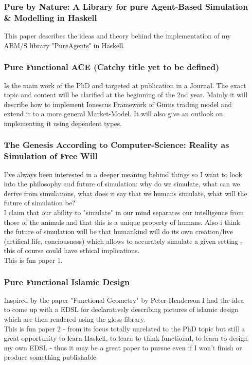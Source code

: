 \subsubsection{Pure by Nature: A Library for pure Agent-Based Simulation \& Modelling in Haskell}
This paper describes the ideas and theory behind the implementation of my ABM/S library "PureAgents" in Haskell.

\subsubsection{Pure Functional ACE (Catchy title yet to be defined)}
Is the main work of the PhD and targeted at publication in a Journal. The exact topic and content will be clarified at the beginning of the 2nd year. Mainly it will describe how to implement Ionescus Framework of Gintis trading model and extend it to a more general Market-Model. It will also give an outlook on implementing it using dependent types.

\subsubsection{The Genesis According to Computer-Science: Reality as Simulation of Free Will}
I've always been interested in a deeper meaning behind things so I want to look into the philosophy and future of simulation: why do we simulate, what can we derive from simulations, what does it say that we humans simulate, what will the future of simulation be? \\
I claim that our ability to "simulate" in our mind separates our intelligence from those of the animals and that this is a unique property of humans. Also i think the future of simulation will be that humankind will do its own creation/live (artifical life, conciousness) which allows to accurately simulate a given setting - this of course could have ethical implications. \\
This is fun paper 1.

\subsubsection{Pure Functional Islamic Design}
Inspired by the paper "Functional Geometry" by Peter Henderson I had the idea to come up with a  EDSL for declaratively describing pictures of islamic design which are then rendered using the gloss-library. \\
This is fun paper 2 - from its focus totally unrelated to the PhD topic but still a great opportunity to learn Haskell, to learn to think functional, to learn to design my own EDSL - thus it may be a great paper to pursue even if I won't finish or produce something publishable.